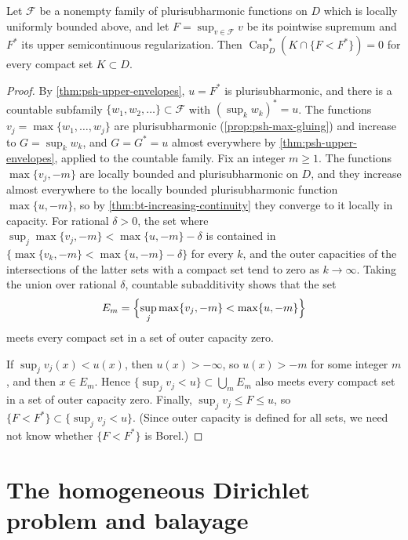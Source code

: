 \begin{corollary}\label{cor:psh-envelope-zero-capacity}
Let $\mathcal F$ be a nonempty family of plurisubharmonic functions on $D$ which is locally uniformly bounded above, and let $F=\sup_{v\in\mathcal F}v$ be its pointwise supremum and $F^*$ its upper semicontinuous regularization. Then $\operatorname{Cap}^*_D(K\cap\{F<F^*\})=0$ for every compact set $K\subset D$.
\end{corollary}
\begin{proof}
By \cref{thm:psh-upper-envelopes}, $u=F^*$ is plurisubharmonic, and there is a countable subfamily $\{w_1,w_2,\ldots\}\subset\mathcal F$ with $(\sup_kw_k)^*=u$. The functions $v_j=\max\{w_1,\ldots,w_j\}$ are plurisubharmonic (\cref{prop:psh-max-gluing}) and increase to $G=\sup_kw_k$, and $G=G^*=u$ almost everywhere by \cref{thm:psh-upper-envelopes}, applied to the countable family. Fix an integer $m\ge1$. The functions $\max\{v_j,-m\}$ are locally bounded and plurisubharmonic on $D$, and they increase almost everywhere to the locally bounded plurisubharmonic function $\max\{u,-m\}$, so by \cref{thm:bt-increasing-continuity} they converge to it locally in capacity. For rational $\delta>0$, the set where $\sup_j\max\{v_j,-m\}<\max\{u,-m\}-\delta$ is contained in $\{\max\{v_k,-m\}<\max\{u,-m\}-\delta\}$ for every $k$, and the outer capacities of the intersections of the latter sets with a compact set tend to zero as $k\to\infty$. Taking the union over rational $\delta$, countable subadditivity shows that the set
\[
 E_m=\Bigl\{\sup_j\max\{v_j,-m\}<\max\{u,-m\}\Bigr\}
\]
meets every compact set in a set of outer capacity zero.

If $\sup_jv_j(x)<u(x)$, then $u(x)>-\infty$, so $u(x)>-m$ for some integer $m$, and then $x\in E_m$. Hence $\{\sup_jv_j<u\}\subset\bigcup_mE_m$ also meets every compact set in a set of outer capacity zero. Finally, $\sup_jv_j\le F\le u$, so $\{F<F^*\}\subset\{\sup_jv_j<u\}$. (Since outer capacity is defined for all sets, we need not know whether $\{F<F^*\}$ is Borel.)
\end{proof}

\section{The homogeneous Dirichlet problem and balayage}
\label{sec:bt-homogeneous-dirichlet}

